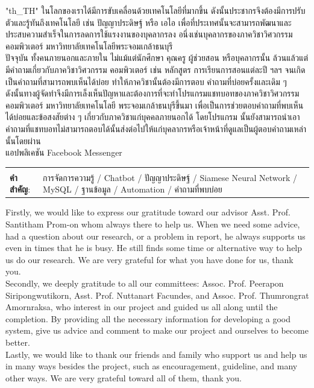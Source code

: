 \documentclass[12pt,oneside,openright,a4paper]{cpe-english-project}
\begin{document}
{
\XeTeXlinebreaklocale "th_TH"	
\thaifont
\thaiabstract
ในโลกของเราได้มีการขับเคลื่อนด้วยเทคโนโลยีที่มากขึ้น ดังนั้นประชากรจึงต้องมีการปรับตัวและรู้ทันถึงเทคโนโลยี เช่น ปัญญาประดิษฐ์ หรือ 
เอไอ เพื่อที่ประเทศนั้นจะสามารถพัฒนาและประสบความสำเร็จในการลดการใช้แรงงานของบุคลากรลง อนึ่งเช่นบุคลากรของภาควิชาวิศวกรรม
คอมพิวเตอร์ มหาวิทยาลัยเทคโนโลยีพระจอมเกล้าธนบุรี\\
ปัจจุบัน ทั้งคนภายนอกและภายใน ไม่แม้แต่นักศึกษา คุณครู ผู้ช่วยสอน หรือบุคลากรนั้น ล้วนแล้วแต่มีคำถามเกี่ยวกับภาควิชาวิศวกรรม
คอมพิวเตอร์ เช่น หลักสูตร การเรียนการสอนแต่ละปี ฯลฯ จนเกิดเป็นคำถามที่สามารถพบเห็นได้บ่อย ทำให้ภาควิชานั้นต้องมีการตอบ
คำถามที่บ่อยครั้งและเดิม ๆ\\
ดังนั้นทางผู้จัดทำจึงมีการเล็งเห็นปัญหาและต้องการที่จะทำโปรแกรมแชทบอทของภาควิชาวิศวกรรมคอมพิวเตอร์ มหาวิทยาลัยเทคโนโลยี
พระจอมเกล้าธนบุรีขึ้นมา เพื่อเป็นการช่วยตอบคำถามที่พบเห็นได้บ่อยและข้อสงสัยต่าง ๆ เกี่ยวกับภาควิชาแก่บุคคลภายนอกได้ โดยโปรแกรม
นั้นยังสามารถนำเอาคำถามที่แชทบอทไม่สามารถตอบได้นั้นส่งต่อไปให้แก่บุคลากรหรือเจ้าหน้าที่ดูแลเป็นผู้ตอบคำถามเหล่านั้นโดยผ่าน
\\แอปพลิเคชัน Facebook Messenger

\begin{flushleft}
\begin{tabular*}{\textwidth}{@{}lp{}}
 & \\

\textbf{คำสำคัญ}: & การจัดการความรู้ / Chatbot / ปัญญาประดิษฐ์ / Siamese Neural Network / MySQL / ฐานข้อมูล / Automation / คำถามที่พบบ่อย
\end{tabular*}
\end{flushleft}
\endabstract
}

\preface
Firstly, we would like to express our gratitude toward our advisor Asst. Prof. Santitham Prom-on whom always 
there to help us. When we need some advice, had a question about our research, or a problem in report, he 
always supports us even in times that he is busy. He still finds some time or alternative way to help us do our 
research. We are very grateful for what you have done for us, thank you.
\\Secondly, we deeply gratitude to all our committees: Assoc. Prof. Peerapon Siripongwutikorn, Asst. 
Prof. Nuttanart Facundes, and Assoc. Prof. Thumrongrat Amornraksa, who interest in our project and guided 
us all along until the completion.  By providing all the necessary information for developing a good system, 
give us advice and comment to make our project and ourselves to become better.
\\Lastly, we would like to thank our friends and family who support us and help us in many ways besides the 
project, such as encouragement, guideline, and many other ways. We are very grateful toward all of them, 
thank you.
\end{document}
